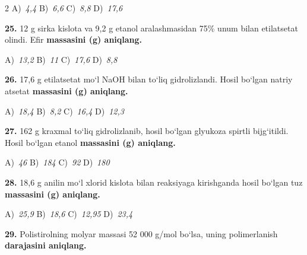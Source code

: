 \documentclass[11pt,a4paper]{article}
\begin{document}
\begin{multicols}{2}
\noindent A)~\textsl{4,4} \hfill B)~\textsl{6,6} \hfill C)~\textsl{8,8} \hfill D)~\textsl{17,6}\par
\vspace{4pt}
\noindent\textbf{25.} 12 g sirka kislota va 9,2 g etanol aralashmasidan 75\% unum bilan etilatsetat olindi. Efir \textbf{massasini (g) aniqlang.}

\noindent A)~\textsl{13,2} \hfill B)~\textsl{11} \hfill C)~\textsl{17,6} \hfill D)~\textsl{8,8}\par
\vspace{4pt}
\noindent\textbf{26.} 17,6 g etilatsetat mo`l NaOH bilan to`liq gidrolizlandi. Hosil bo`lgan natriy atsetat \textbf{massasini (g) aniqlang.}

\noindent A)~\textsl{18,4} \hfill B)~\textsl{8,2} \hfill C)~\textsl{16,4} \hfill D)~\textsl{12,3}\par
\vspace{4pt}
\noindent\textbf{27.} 162 g kraxmal to`liq gidrolizlanib, hosil bo`lgan glyukoza spirtli bijg`itildi. Hosil bo`lgan etanol \textbf{massasini (g) aniqlang.}

\noindent A)~\textsl{46} \hfill B)~\textsl{184} \hfill C)~\textsl{92} \hfill D)~\textsl{180}\par
\vspace{4pt}
\noindent\textbf{28.} 18,6 g anilin mo`l xlorid kislota bilan reaksiyaga kirishganda hosil bo`lgan tuz \textbf{massasini (g) aniqlang.}

\noindent A)~\textsl{25,9} \hfill B)~\textsl{18,6} \hfill C)~\textsl{12,95} \hfill D)~\textsl{23,4}\par
\vspace{4pt}
\noindent\textbf{29.} Polistirolning molyar massasi 52 000 g/mol bo`lsa, uning polimerlanish \textbf{darajasini aniqlang.}


\end{multicols}
\end{document}
